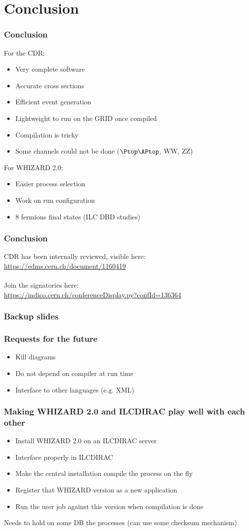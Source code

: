 \documentclass{beamer}
\newcommand{\whizard}{WHIZARD\xspace}
\begin{document}
\section{Conclusion}
\begin{frame}
\frametitle{Conclusion}
For the CDR:
\begin{itemize}
  \item Very complete software
  \item Accurate cross sections
  \item Efficient event generation
  \item Lightweight to run on the GRID once compiled
  \item Compilation is tricky
  \item Some channels could not be done ($\Ptop\APtop$, WW, ZZ)
\end{itemize}
For \whizard 2.0:
\begin{itemize}
  \item Easier process selection
  \item Work on run configuration
  \item 8 fermions final states (ILC DBD studies)
\end{itemize}
\end{frame}
\begin{frame}
\frametitle{Conclusion} 
CDR has been internally reviewed, visible here:\\
 \url{https://edms.cern.ch/document/1160419}\\
~\\
Join the signatories here:\\
\url{https://indico.cern.ch/conferenceDisplay.py?confId=136364}
\end{frame}

\appendix
\begin{frame} 
\frametitle{Backup slides}
\end{frame}
\begin{frame}
\frametitle{Requests for the future}
\begin{itemize}
  \item Kill diagrams
  \item Do not depend on compiler at run time
  \item Interface to other languages (e.g. XML)
\end{itemize}
\end{frame}
\begin{frame}
\frametitle{Making \whizard2.0 and ILCDIRAC play well with each other}
\begin{itemize}
  \item Install \whizard2.0 on an ILCDIRAC server
  \item Interface properly in ILCDIRAC
  \item Make the central installation compile the process on the fly
  \item Register that \whizard version as a new application
  \item Run the user job against this version when compilation is done
\end{itemize}
Needs to hold on some DB the processes (can use some checksum mechanism)
\end{frame}
\end{document}
